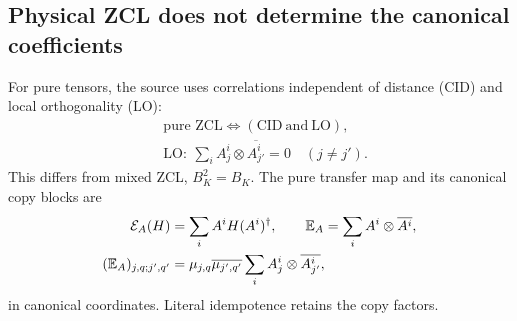 \documentclass[aps,pra,reprint,nofootinbib,onecolumn]{revtex4-2}
\begin{document}
\subsection{Physical ZCL does not determine the canonical coefficients}

For pure tensors, the source uses correlations independent of
distance (CID) and local orthogonality (LO):
\begin{align}
	 & \text{pure ZCL}\iff(\text{CID}\ \text{and}\ \text{LO}),\nonumber \\
	 & \text{LO}:\ \sum_iA_j^i\otimes\overline{A_{j'}^i}=0
	\quad(j\ne j').
	\label{eq:pure-zcl-lo}
\end{align}
This differs from mixed ZCL, $B_K^2=B_K$.
The pure transfer map and its canonical copy blocks are
\begin{align}
	\mathcal{E}_A(H) & =\sum_iA^iH(A^i)^\dagger,\qquad
	\mathbb E_A=\sum_iA^i\otimes\overline{A^i},\nonumber \\
	(\mathbb E_A)_{j,q;j',q'}
	           & =\mu_{j,q}\overline{\mu_{j',q'}}
	\sum_iA_j^i\otimes\overline{A_{j'}^i},
	\label{eq:pure-transfer-blocks}
\end{align}
in canonical coordinates. Literal idempotence retains the copy factors.
\end{document}

